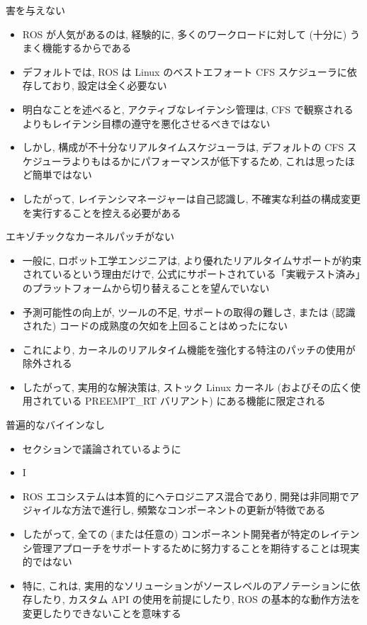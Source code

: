\begin{frame}{害を与えない}
    \begin{itemize}
        \item ROS が人気があるのは, 経験的に, 多くのワークロードに対して (十分に) うまく機能するからである
\item デフォルトでは, ROS は Linux のベストエフォート CFS スケジューラに依存しており, 設定は全く必要ない
\item 明白なことを述べると, アクティブなレイテンシ管理は, CFS で観察されるよりもレイテンシ目標の遵守を悪化させるべきではない
\item しかし, 構成が不十分なリアルタイムスケジューラは, デフォルトの CFS スケジューラよりもはるかにパフォーマンスが低下するため, これは思ったほど簡単ではない
\item したがって, レイテンシマネージャーは自己認識し, 不確実な利益の構成変更を実行することを控える必要がある
    \end{itemize}
\end{frame}

\begin{frame}{エキゾチックなカーネルパッチがない}
    \begin{itemize}
        \item 一般に, ロボット工学エンジニアは, より優れたリアルタイムサポートが約束されているという理由だけで, 公式にサポートされている「実戦テスト済み」のプラットフォームから切り替えることを望んでいない
\item 予測可能性の向上が, ツールの不足, サポートの取得の難しさ, または (認識された) コードの成熟度の欠如を上回ることはめったにない
\item これにより, カーネルのリアルタイム機能を強化する特注のパッチの使用が除外される
\item したがって, 実用的な解決策は, ストック Linux カーネル (およびその広く使用されている PREEMPT\_RT バリアント) にある機能に限定される
    \end{itemize}
\end{frame}

\begin{frame}{普遍的なバイインなし}
    \begin{itemize}
        \item セクションで議論されているように
\item I
\item ROS エコシステムは本質的にヘテロジニアス混合であり, 開発は非同期でアジャイルな方法で進行し, 頻繁なコンポーネントの更新が特徴である
\item したがって, 全ての (または任意の) コンポーネント開発者が特定のレイテンシ管理アプローチをサポートするために努力することを期待することは現実的ではない
\item 特に, これは, 実用的なソリューションがソースレベルのアノテーションに依存したり, カスタム API の使用を前提にしたり, ROS の基本的な動作方法を変更したりできないことを意味する
    \end{itemize}
\end{frame}


